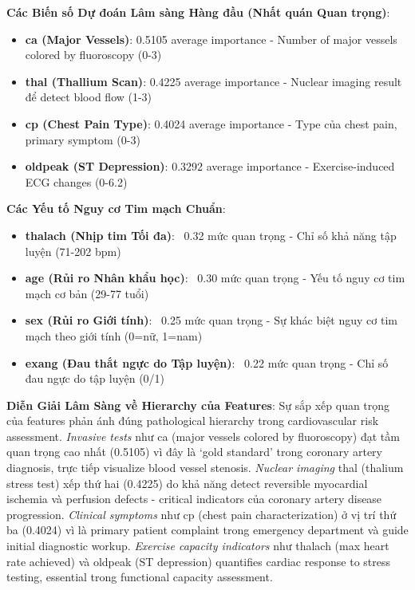 \textbf{Các Biến số Dự đoán Lâm sàng Hàng đầu (Nhất quán Quan trọng)}:
\begin{itemize}
    \item \textbf{ca (Major Vessels)}: 0.5105 average importance - Number of major vessels colored by fluoroscopy (0-3)
    \item \textbf{thal (Thallium Scan)}: 0.4225 average importance - Nuclear imaging result để detect blood flow (1-3)
    \item \textbf{cp (Chest Pain Type)}: 0.4024 average importance - Type của chest pain, primary symptom (0-3)
    \item \textbf{oldpeak (ST Depression)}: 0.3292 average importance - Exercise-induced ECG changes (0-6.2)
\end{itemize}

\textbf{Các Yếu tố Nguy cơ Tim mạch Chuẩn}:
\begin{itemize}
    \item \textbf{thalach (Nhịp tim Tối đa)}: ~0.32 mức quan trọng - Chỉ số khả năng tập luyện (71-202 bpm)
    \item \textbf{age (Rủi ro Nhân khẩu học)}: ~0.30 mức quan trọng - Yếu tố nguy cơ tim mạch cơ bản (29-77 tuổi)
    \item \textbf{sex (Rủi ro Giới tính)}: ~0.25 mức quan trọng - Sự khác biệt nguy cơ tim mạch theo giới tính (0=nữ, 1=nam)
    \item \textbf{exang (Đau thắt ngực do Tập luyện)}: ~0.22 mức quan trọng - Chỉ số đau ngực do tập luyện (0/1)
\end{itemize}

\textbf{Diễn Giải Lâm Sàng về Hierarchy của Features}: Sự sắp xếp quan trọng của features phản ánh đúng pathological hierarchy trong cardiovascular risk assessment. \textit{Invasive tests} như ca (major vessels colored by fluoroscopy) đạt tầm quan trọng cao nhất (0.5105) vì đây là `gold standard' trong coronary artery diagnosis, trực tiếp visualize blood vessel stenosis. \textit{Nuclear imaging} thal (thalium stress test) xếp thứ hai (0.4225) do khả năng detect reversible myocardial ischemia và perfusion defects - critical indicators của coronary artery disease progression. \textit{Clinical symptoms} như cp (chest pain characterization) ở vị trí thứ ba (0.4024) vì là primary patient complaint trong emergency department và guide initial diagnostic workup. \textit{Exercise capacity indicators} như thalach (max heart rate achieved) và oldpeak (ST depression) quantifies cardiac response to stress testing, essential trong functional capacity assessment.

